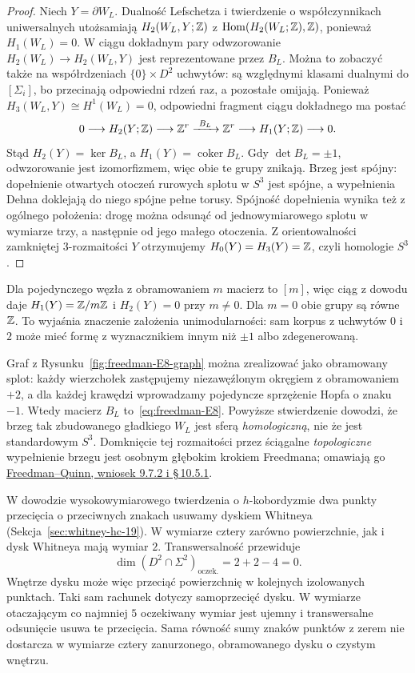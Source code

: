 \begin{proof}
Niech $Y=\partial W_L$. Dualność Lefschetza i
twierdzenie o współczynnikach uniwersalnych
utożsamiają $H_2(W_L,Y;\mathbb{Z})$ z
$\operatorname{Hom}(H_2(W_L;\mathbb{Z}),\mathbb{Z})$, ponieważ
$H_1(W_L)=0$. W ciągu dokładnym pary odwzorowanie
$H_2(W_L)\to H_2(W_L,Y)$ jest reprezentowane przez
$B_L$. Można to zobaczyć także na współrdzeniach
$\{0\}\times D^2$ uchwytów: są względnymi klasami
dualnymi do $[\Sigma_i]$, bo przecinają odpowiedni
rdzeń raz, a pozostałe omijają.
Ponieważ $H_3(W_L,Y)\cong H^1(W_L)=0$, odpowiedni
fragment ciągu dokładnego ma postać
\[
 0\longrightarrow H_2(Y;\mathbb{Z})\longrightarrow\mathbb{Z}^r
 \xrightarrow{\ B_L\ }\mathbb{Z}^r
 \longrightarrow H_1(Y;\mathbb{Z})\longrightarrow0.
\]
Stąd $H_2(Y)=\ker B_L$, a $H_1(Y)=\operatorname{coker}B_L$.
Gdy $\det B_L=\pm1$, odwzorowanie jest izomorfizmem,
więc obie te grupy znikają.
Brzeg jest spójny: dopełnienie otwartych otoczeń
rurowych splotu w $S^3$ jest spójne, a wypełnienia
Dehna doklejają do niego spójne pełne torusy.
Spójność dopełnienia wynika też z ogólnego położenia:
drogę można odsunąć od jednowymiarowego splotu
w wymiarze trzy, a następnie od jego małego otoczenia.
Z orientowalności zamkniętej $3$-rozmaitości $Y$
otrzymujemy $H_0(Y)=H_3(Y)=\mathbb{Z}$, czyli homologie $S^3$.
\end{proof}

Dla pojedynczego węzła z obramowaniem $m$ macierz to
$[m]$, więc ciąg z dowodu daje
$H_1(Y)=\mathbb{Z}/m\mathbb{Z}$ i $H_2(Y)=0$ przy $m\ne0$.
Dla $m=0$ obie grupy są równe $\mathbb{Z}$.
To wyjaśnia znaczenie założenia unimodularności:
sam korpus z uchwytów $0$ i $2$ może mieć formę
z wyznacznikiem innym niż $\pm1$ albo zdegenerowaną.

Graf z Rysunku~\ref{fig:freedman-E8-graph} można
zrealizować jako obramowany splot: każdy wierzchołek
zastępujemy niezawęźlonym okręgiem z obramowaniem
$+2$, a dla każdej krawędzi wprowadzamy pojedyncze
sprzężenie Hopfa o znaku $-1$. Wtedy macierz
$B_L$ to~\eqref{eq:freedman-E8}. Powyższe
stwierdzenie dowodzi, że brzeg tak zbudowanego
gładkiego $W_L$ jest sferą \emph{homologiczną},
nie że jest standardowym $S^3$. Domknięcie tej
rozmaitości przez ściągalne \emph{topologiczne}
wypełnienie brzegu jest osobnym głębokim krokiem
Freedmana; omawiają go
\href{https://archive.mpim-bonn.mpg.de/4789/2/FreedmanQuinn-TopologyOf4Manifolds-Reformatted2013.pdf}
{Freedman--Quinn, wniosek 9.7.2 i \S\,10.5.1}.

W dowodzie wysokowymiarowego twierdzenia o
$h$-kobordyzmie dwa punkty przecięcia o przeciwnych
znakach usuwamy dyskiem Whitneya
(Sekcja~\ref{sec:whitney-hc-19}). W wymiarze cztery
zarówno powierzchnie, jak i dysk Whitneya mają
wymiar $2$. Transwersalność przewiduje
\begin{equation}\label{eq:freedman-whitney-count}
 \dim(D^2\cap\Sigma^2)_{\mathrm{oczek.}}
       =2+2-4=0.
\end{equation}
Wnętrze dysku może więc przeciąć powierzchnię
w kolejnych izolowanych punktach. Taki sam rachunek
dotyczy samoprzecięć dysku. W wymiarze otaczającym
co najmniej $5$ oczekiwany wymiar jest ujemny i
transwersalne odsunięcie usuwa te przecięcia.
Sama równość sumy znaków punktów z zerem nie dostarcza
w wymiarze cztery zanurzonego, obramowanego dysku
o czystym wnętrzu.

